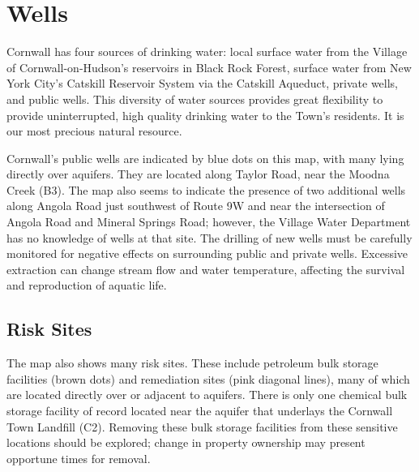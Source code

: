 \section*{Wells}\label{subsec:wells}
Cornwall has four sources of drinking water: local surface water from the 
Village of Cornwall-on-Hudson’s reservoirs in Black Rock Forest, surface water 
from New York City’s Catskill Reservoir System via the Catskill Aqueduct, 
private wells, and public wells. This diversity of water sources provides great 
flexibility to provide uninterrupted, high quality drinking water to the Town’s 
residents. It is our most precious natural resource.
\par
Cornwall's public wells are indicated by blue dots on this map, with many lying 
directly over aquifers. They are located along Taylor Road, near the Moodna 
Creek (B3). The map also seems to indicate the presence of two additional wells 
along Angola Road just southwest of Route 9W and near the intersection of Angola 
Road and Mineral Springs Road; however, the Village Water Department has no 
knowledge of wells at that site. The drilling of new wells must be carefully 
monitored for negative effects on surrounding public and private wells. 
Excessive extraction can change stream flow and water temperature, affecting the 
survival and reproduction of aquatic life.

\subsection*{Risk Sites}\label{subsec:risksites}
The map also shows many risk sites. These include petroleum bulk storage 
facilities (brown dots) and remediation sites (pink diagonal lines), many of 
which are located directly over or adjacent to aquifers. There is only one 
chemical bulk storage facility of record located near the aquifer that 
underlays the Cornwall Town Landfill (C2). Removing these bulk storage 
facilities from these sensitive locations should be explored; change in property 
ownership may present opportune times for removal.

